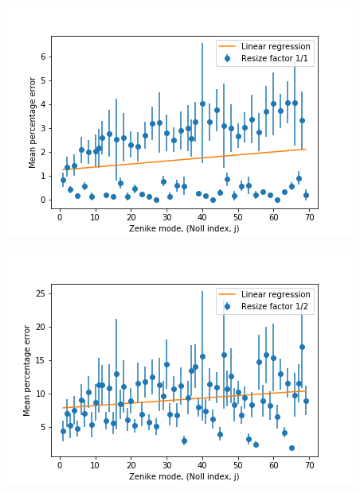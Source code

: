 \begin{figure}[h]
	\centering
	\begin{subfigure}{0.48\textwidth}
		\centering
		\includegraphics[width=\linewidth]{images/Zernike_fitting_percentage_error_random_modes_repeat_resize_factor_1.png}
		\caption{}
		\label{fig:Zernike_fitting_percentage_error_random_modes_repeat_resize_factor_1}
	\end{subfigure}
	\begin{subfigure}{0.48\textwidth}
		\centering
		\includegraphics[width=\linewidth]{images/Zernike_fitting_percentage_error_random_modes_repeat_resize_factor_2.png}
		\caption{}
		\label{fig:Zernike_fitting_percentage_error_random_modes_repeat_resize_factor_2}
	\end{subfigure}
	

\end{figure}
